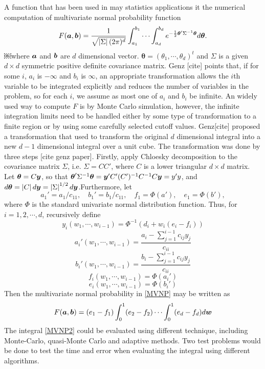 \documentclass{iitthesis}
\begin{document}
A function that has been used in may statistics applications it the numerical computation of multivariate normal probability function 
\begin{equation}\label{MVNP}
F(\boldsymbol{a},\boldsymbol{b}) = \frac{1}{\sqrt{\left \lvert \Sigma \right \rvert(2\pi)^d}}\int_{a_1}^{b_1}\cdots\int_{a_d}^{b_d} e^{-\frac{1}{2} \boldsymbol{\theta}'\Sigma^{-1}\boldsymbol{\theta} }d\boldsymbol{\theta} .
\end{equation}
￼where $\boldsymbol{a}$ and $\boldsymbol{b}$ are $d$ dimensional vector. $\boldsymbol{\theta} = (\theta_1,\cdots,\theta_d)^t$ and $\Sigma$ is a given $d \times d$ symmetric positive definite covariance matrix. Genz [cite] points that, if for some $i$, $a_i$ is $-\infty$ and $b_i$ is $\infty$, an appropriate transformation allows the $i$th variable to be integrated explicitly and reduces the number of variables in the problem, so for each $i$, we assume as most one of $a_i$ and $b_i$ be infinite. 
An widely used way to compute $F$ is by Monte Carlo simulation, however, the infinite integration limits need to be handled either by some type of transformation to a finite region or by using some carefully selected cutoff values. Genz[cite] proposed a transformation that used to transform the original $d$ dimensional integral into a new $d-1$ dimensional integral over a unit cube. The transformation was done by three steps [cite genz paper]. Firstly, apply Chloesky decomposition to the covariance matrix $\Sigma$, i.e. $\Sigma = CC'$, where $C$ is a lower triangular $d \times d$ matrix. Let $\boldsymbol{\theta}=C \boldsymbol{y}$, so that $\boldsymbol{\theta}'\Sigma^{-1}\boldsymbol{\theta} = \boldsymbol{y}' C'(C')^{-1} C^{-1}C\boldsymbol{y} =y'y$, and $d\boldsymbol{\theta}=\left \lvert C \right \rvert d\boldsymbol{y} = \left \lvert \Sigma \right \rvert^{1/2} d\boldsymbol{y}$.Furthermore, let
$$a_1'=a_1/c_{11}, \quad b_1'=b_1/c_{11}, \quad f_1=\Phi(a'), \quad  e_1 = \Phi(b'),$$
where $\Phi$ is the standard univariate normal distribution function. 
Thus, for $i=1,2,\cdots,d$, recursively define
$$y_{i}(w_1,\cdots,w_{i-1}) = \Phi^{-1} (d_i+w_i(e_i-f_i))$$
$$a_i'(w_1,\cdots,w_{i-1}) = \frac{a_i-\sum_{j=1}^{i-1} c_{ij}y_j}{c_{ii}}$$
$$b_i'(w_1,\cdots,w_{i-1}) = \frac{b_i-\sum_{j=1}^{i-1} c_{ij}y_j}{c_{ii}}$$
$$f_i(w_1,\cdots,w_{i-1}) = \Phi(a_i')$$
$$e_i(w_1,\cdots,w_{i-1}) = \Phi(b_i')$$
 Then the multivariate normal probability in \eqref{MVNP} may be written as 
\begin{equation}\label{MVNP2}
F(\boldsymbol{a},\boldsymbol{b}) = (e_1-f_1)\int_0^1 (e_2-f_2) \cdots \int_0^1(e_d-f_d)d\boldsymbol{w}
\end{equation}
The integral \eqref{MVNP2} could be evaluated using different technique, including Monte-Carlo, quasi-Monte Carlo and adaptive methods. Two test problems would be done to test the time and error when evaluating the integral using different algorithms.
\end{document}
